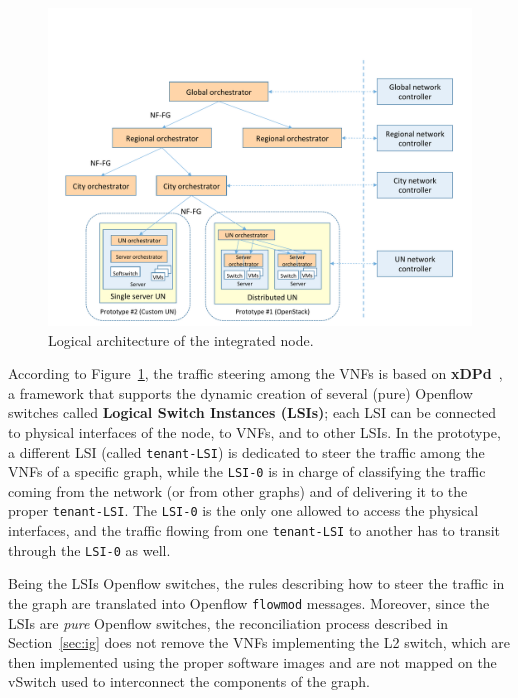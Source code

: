 \begin{figure}%
	\centering
	\includegraphics[clip= true, width= 0.8\columnwidth, trim= 0.6cm 2.3cm 1.3cm 1.0cm, page = 16]{images/Pictures.pdf}
	\caption{Logical architecture of the integrated node.}
	\label{fig:proto_unify}
\end{figure}


According to Figure~\ref{fig:proto_unify}, the traffic steering among the VNFs is based on \textbf{xDPd}~\cite{xdpdwebsite}, a framework that supports the dynamic creation of several (pure) Openflow switches called \textbf{Logical Switch Instances (LSIs)}; each LSI can be connected to physical interfaces of the node, to VNFs, and to other LSIs.
In the prototype, a different LSI (called \texttt{tenant-LSI}) is dedicated to steer the traffic among the VNFs of a specific graph, while the \texttt{LSI-0} is in charge of classifying the traffic coming from the network (or from other graphs) and of delivering it to the proper \texttt{tenant-LSI}. %
The \texttt{LSI-0} is the only one allowed to access the physical interfaces, and the traffic flowing from one \texttt{tenant-LSI} to another has to transit through the \texttt{LSI-0} as well.

Being the LSIs Openflow switches, the rules describing how to steer the traffic in the graph are translated into Openflow \texttt{flowmod} messages.
Moreover, since the LSIs are \textit{pure} Openflow switches, the reconciliation process described in Section~\ref{sec:ig} does not remove the VNFs implementing the L2 switch, which are then implemented using the proper software images and are not mapped on the vSwitch used to interconnect the components of the graph.

